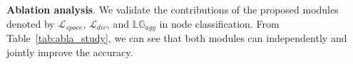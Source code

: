 \documentclass[accepted]{uai2021} %
\begin{document}
\textbf{Ablation analysis}. We validate the contributions of the proposed modules denoted by $\mathcal{L}_{space}$, $\mathcal{L}_{div}$, and $\mathbb{LG}_{agg}$ in  node classification. From Table~{\ref{tab:abla_study}}, we can see that both modules can independently and jointly improve the accuracy.

\begin{table}[ht]
\centering
\setlength{\abovecaptionskip}{2pt}\makeatletter{}\makeatother\caption{Ablation analysis in node classification accuracies.}
\label{tab:abla_study}
\end{table}
\end{document}
